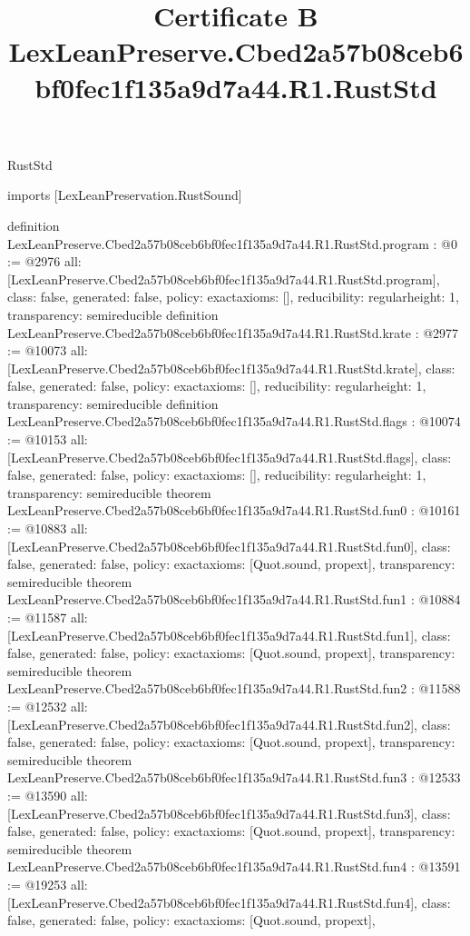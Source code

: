 \begin{lexlean}{RustStd}
\title{Certificate B LexLeanPreserve.Cbed2a57b08ceb6bf0fec1f135a9d7a44.R1.RustStd}
\begin{coremodule}
imports [LexLeanPreservation.RustSound]

definition LexLeanPreserve.Cbed2a57b08ceb6bf0fec1f135a9d7a44.R1.RustStd.program : @0 := @2976 {
  all: [LexLeanPreserve.Cbed2a57b08ceb6bf0fec1f135a9d7a44.R1.RustStd.program],
  class: false,
  generated: false,
  policy: exact{axioms: []},
  reducibility: regular{height: 1},
  transparency: semireducible
}
definition LexLeanPreserve.Cbed2a57b08ceb6bf0fec1f135a9d7a44.R1.RustStd.krate : @2977 := @10073 {
  all: [LexLeanPreserve.Cbed2a57b08ceb6bf0fec1f135a9d7a44.R1.RustStd.krate],
  class: false,
  generated: false,
  policy: exact{axioms: []},
  reducibility: regular{height: 1},
  transparency: semireducible
}
definition LexLeanPreserve.Cbed2a57b08ceb6bf0fec1f135a9d7a44.R1.RustStd.flags : @10074 := @10153 {
  all: [LexLeanPreserve.Cbed2a57b08ceb6bf0fec1f135a9d7a44.R1.RustStd.flags],
  class: false,
  generated: false,
  policy: exact{axioms: []},
  reducibility: regular{height: 1},
  transparency: semireducible
}
theorem LexLeanPreserve.Cbed2a57b08ceb6bf0fec1f135a9d7a44.R1.RustStd.fun0 : @10161 := @10883 {
  all: [LexLeanPreserve.Cbed2a57b08ceb6bf0fec1f135a9d7a44.R1.RustStd.fun0],
  class: false,
  generated: false,
  policy: exact{axioms: [Quot.sound, propext]},
  transparency: semireducible
}
theorem LexLeanPreserve.Cbed2a57b08ceb6bf0fec1f135a9d7a44.R1.RustStd.fun1 : @10884 := @11587 {
  all: [LexLeanPreserve.Cbed2a57b08ceb6bf0fec1f135a9d7a44.R1.RustStd.fun1],
  class: false,
  generated: false,
  policy: exact{axioms: [Quot.sound, propext]},
  transparency: semireducible
}
theorem LexLeanPreserve.Cbed2a57b08ceb6bf0fec1f135a9d7a44.R1.RustStd.fun2 : @11588 := @12532 {
  all: [LexLeanPreserve.Cbed2a57b08ceb6bf0fec1f135a9d7a44.R1.RustStd.fun2],
  class: false,
  generated: false,
  policy: exact{axioms: [Quot.sound, propext]},
  transparency: semireducible
}
theorem LexLeanPreserve.Cbed2a57b08ceb6bf0fec1f135a9d7a44.R1.RustStd.fun3 : @12533 := @13590 {
  all: [LexLeanPreserve.Cbed2a57b08ceb6bf0fec1f135a9d7a44.R1.RustStd.fun3],
  class: false,
  generated: false,
  policy: exact{axioms: [Quot.sound, propext]},
  transparency: semireducible
}
theorem LexLeanPreserve.Cbed2a57b08ceb6bf0fec1f135a9d7a44.R1.RustStd.fun4 : @13591 := @19253 {
  all: [LexLeanPreserve.Cbed2a57b08ceb6bf0fec1f135a9d7a44.R1.RustStd.fun4],
  class: false,
  generated: false,
  policy: exact{axioms: [Quot.sound, propext]},
}
\end{coremodule}
\end{lexlean}
